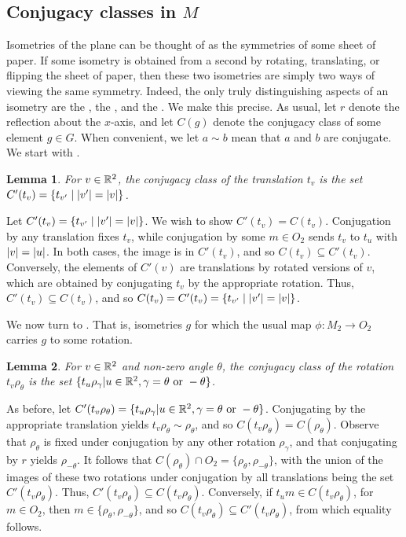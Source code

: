 \documentclass{scrartcl}
\newtheorem{lemma}{Lemma}
\begin{document}
\newpage
\subsection{Conjugacy classes in $M$}

\begin{solution}
    Isometries of the plane can be thought of as the symmetries of some sheet of paper. If some isometry is obtained from a second by rotating, translating, or flipping the sheet of paper, then these two isometries are simply two ways of viewing the same symmetry. Indeed, the only truly distinguishing aspects of an isometry are the , the , and the . We make this precise. As usual, let $r$ denote the reflection about the $x$-axis, and let $C(g)$ denote the conjugacy class of some element $g\in G$. When convenient, we let $a\sim b$ mean that $a$ and $b$ are conjugate. We start with .
    \begin{lemma}
    For $v\in \mathbb R^2$, the conjugacy class of the translation $t_v$ is the set $C'(t_v)=\{t_{v'}\mid \lvert v'\rvert=\lvert v\rvert\}$.
    \end{lemma}
    \begin{tproof}
    Let $C'(t_v)=\{t_{v'}\mid \lvert v'\rvert=\lvert v\rvert\}$. We wish to show $C'(t_v)=C(t_v)$. Conjugation by any translation fixes $t_v$, while conjugation by some $m\in O_2$ sends $t_v$ to $t_u$ with $\lvert v\rvert=\lvert u\rvert$. In both cases, the image is in $C'(t_v)$, and so $C(t_v)\subseteq C'(t_v)$. Conversely, the elements of $C'(v)$ are translations by rotated versions of $v$, which are obtained by conjugating $t_v$ by the appropriate rotation. Thus, $C'(t_v)\subseteq C(t_v)$, and so $C(t_v)=C'(t_v)=\{t_{v'}\mid \lvert v'\rvert=\lvert v\rvert\}$.
    \end{tproof}

    We now turn to . That is, isometries $g$ for which the usual map $\phi: M_2 \to O_2$ carries $g$ to some rotation.
    \begin{lemma}
    For $v\in \mathbb R^2$ and non-zero angle $\theta$, the conjugacy class of the rotation $t_v\rho_\theta$ is the set $\{t_u\rho_\gamma| u\in \mathbb R^2, \gamma=\theta \text{ or } -\theta\}$.
    \end{lemma}
    \begin{tproof} As before, let $C'(t_v\rho_\theta)=\{t_u\rho_\gamma| u\in \mathbb R^2, \gamma=\theta \text{ or } -\theta\}$. Conjugating by the appropriate translation yields $t_v\rho_\theta\sim \rho_\theta$, and so $C(t_v\rho_\theta)=C(\rho_\theta)$. Observe that $\rho_\theta$ is fixed under conjugation by any other rotation $\rho_\gamma$, and that conjugating by $r$ yields $\rho_{-\theta}$. It follows that $C(\rho_\theta)\cap O_2=\{\rho_{\theta},\rho_{-\theta}\}$, with the union of the images of these two rotations under conjugation by all translations being the set $C'(t_v\rho_\theta)$. Thus, $C'(t_v\rho_\theta)\subseteq C(t_v\rho_\theta)$. Conversely, if $t_um\in C(t_v\rho_\theta)$, for $m\in O_2$, then $m\in \{\rho_{\theta},\rho_{-\theta}\}$, and so $C(t_v\rho_\theta)\subseteq C'(t_v\rho_\theta)$, from which equality follows.
    \end{tproof}


\end{solution}
\end{document}
